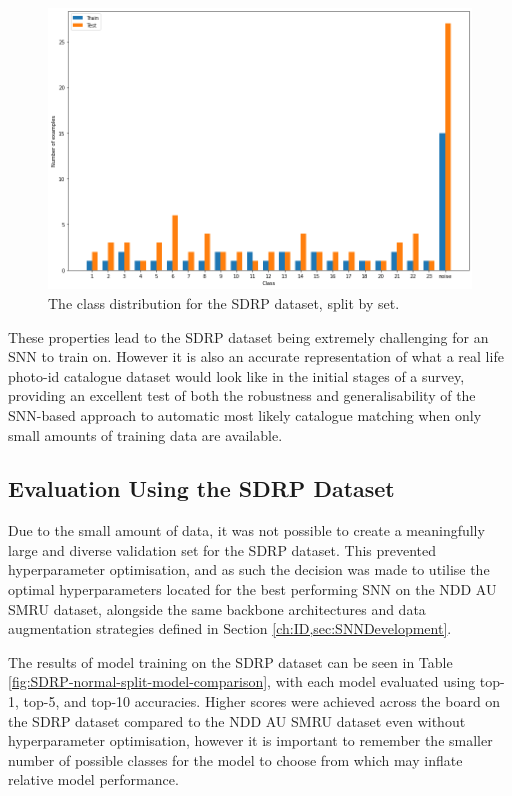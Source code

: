 \begin{figure}[!h]
	\begin{center}
		\includegraphics[scale=0.38]{Chapter6/figs/SDRP-class-dist.png}
	\end{center}
	\caption{The class distribution for the SDRP dataset, split by set.}
	\label{fig:sdrp-dist}
\end{figure}

These properties lead to the SDRP dataset being extremely challenging for an SNN to train on. However it is also an accurate representation of what a real life photo-id catalogue dataset would look like in the initial stages of a survey, providing an excellent test of both the robustness and generalisability of the SNN-based approach to automatic most likely catalogue matching when only small amounts of training data are available. 

\subsection{Evaluation Using the SDRP Dataset}\label{ch:SNNEvaluation,sec:SDRP,sub:SNNEvalWithSDRP}

Due to the small amount of data, it was not possible to create a meaningfully large and diverse validation set for the SDRP dataset. This prevented hyperparameter optimisation, and as such the decision was made to utilise the optimal hyperparameters located for the best performing SNN on the NDD AU SMRU dataset, alongside the same backbone architectures and data augmentation strategies defined in Section \ref{ch:ID,sec:SNNDevelopment}.

The results of model training on the SDRP dataset can be seen in Table \ref{fig:SDRP-normal-split-model-comparison}, with each model evaluated using top-1, top-5, and top-10 accuracies.
Higher scores were achieved across the board on the SDRP dataset compared to the NDD AU SMRU dataset even without hyperparameter optimisation, however it is important to remember the smaller number of possible classes for the model to choose from which may inflate relative model performance.


